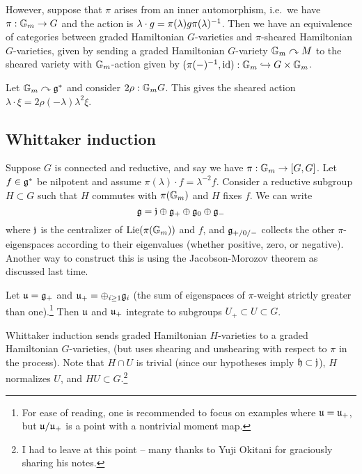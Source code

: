 \documentclass{article}
\begin{document}
However, suppose that $\pi$ arises from an inner automorphism, i.e.\ we have $\pi: \mathbb{G}_m \to G$ and the action is $\lambda \cdot g = \pi(\lambda) g \pi(\lambda)^{-1}$.
Then we have an equivalence of categories between graded Hamiltonian $G$-varieties and $\pi$-sheared Hamiltonian $G$-varieties, given by sending a graded Hamiltonian $G$-variety $\mathbb{G}_m \curvearrowright M$ to the sheared variety with $\mathbb{G}_m$-action given by $(\pi(-)^{-1}, \operatorname{id}): \mathbb{G}_m \hookrightarrow G \times \mathbb{G}_m$.

\begin{ex}
	Let $\mathbb{G}_m \curvearrowright \mathfrak{g}^*$ and consider $2\rho: \mathbb{G}_m G$.
	This gives the sheared action $\lambda \cdot \xi = 2\rho(-\lambda) \lambda^2 \xi$.
\end{ex}

\subsection{Whittaker induction}

Suppose $G$ is connected and reductive, and say we have $\pi: \mathbb{G}_m \to [G, G]$.
Let $f \in \mathfrak{g}^*$ be nilpotent and assume $\pi(\lambda) \cdot f = \lambda^{-2} f$.
Consider a reductive subgroup $H \subset G$ such that $H$ commutes with $\pi(\mathbb{G}_m)$ and $H$ fixes $f$.
We can write
\[
	\mathfrak{g} = \mathfrak{j} \oplus \mathfrak{g}_+ \oplus \mathfrak{g}_0 \oplus \mathfrak{g}_-
\]
where $\mathfrak{j}$ is the centralizer of $\operatorname{Lie}(\pi(\mathbb{G}_m))$ and $f$, and $\mathfrak{g}_{+/0/-}$ collects the other $\pi$-eigenspaces according to their eigenvalues (whether positive, zero, or negative).
Another way to construct this is using the Jacobson-Morozov theorem as discussed last time.

Let $\mathfrak{u} = \mathfrak{g}_+$ and $\mathfrak{u}_+ = \oplus_{i \geq 1} \mathfrak{g}_i$ (the sum of eigenspaces of $\pi$-weight strictly greater than one).\footnote{For ease of reading, one is recommended to focus on examples where $\mathfrak{u} = \mathfrak{u}_+$, but $\mathfrak{u} / \mathfrak{u}_+$ is a point with a nontrivial moment map.}
Then $\mathfrak{u}$ and $\mathfrak{u}_+$ integrate to subgroups $U_+ \subset U \subset G$.

Whittaker induction sends graded Hamiltonian $H$-varieties to a graded Hamiltonian $G$-varieties, (but uses shearing and unshearing with respect to $\pi$ in the process).
Note that $H \cap U$ is trivial (since our hypotheses imply $\mathfrak{h} \subset \mathfrak{j}$), $H$ normalizes $U$, and $HU \subset G$.\footnote{I had to leave at this point -- many thanks to Yuji Okitani for graciously sharing his notes.}
\end{document}
